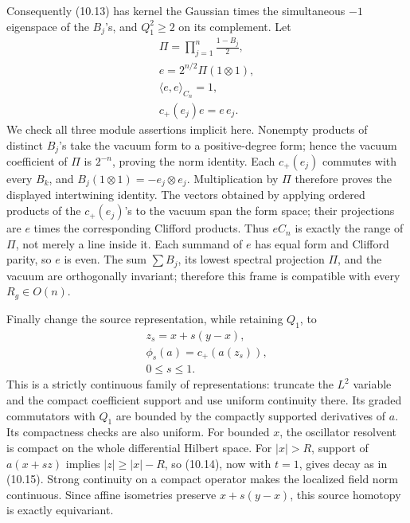 \documentclass[
  11pt,
]{article}
\begin{document}
Consequently (10.13) has kernel the Gaussian times the simultaneous
\(-1\) eigenspace of the \(B_j\)'s, and \(Q_1^2\geq2\) on its
complement. Let \[
\begin{gathered}
\Pi=\prod_{j=1}^n\frac{1-B_j}{2},\\
e=2^{n/2}\Pi(1\otimes1),\\
\langle e,e\rangle_{C_n}=1,\\
c_+(e_j)e=e\,e_j.
\end{gathered}
\tag{10.16}
\] We check all three module assertions implicit here. Nonempty products
of distinct \(B_j\)'s take the vacuum form to a positive-degree form;
hence the vacuum coefficient of \(\Pi\) is \(2^{-n}\), proving the norm
identity. Each \(c_+(e_j)\) commutes with every \(B_k\), and
\(B_j(1\otimes1)=-e_j\otimes e_j\). Multiplication by \(\Pi\) therefore
proves the displayed intertwining identity. The vectors obtained by
applying ordered products of the \(c_+(e_j)\)'s to the vacuum span the
form space; their projections are \(e\) times the corresponding Clifford
products. Thus \(e C_n\) is exactly the range of \(\Pi\), not merely a
line inside it. Each summand of \(e\) has equal form and Clifford
parity, so \(e\) is even. The sum \(\sum B_j\), its lowest spectral
projection \(\Pi\), and the vacuum are orthogonally invariant; therefore
this frame is compatible with every \(R_g\in O(n)\).

Finally change the source representation, while retaining \(Q_1\), to \[
\begin{gathered}
z_s=x+s(y-x),\\
\phi_s(a)=c_+(a(z_s)),\\
0\leq s\leq1.
\end{gathered}
\tag{10.17}
\] This is a strictly continuous family of representations: truncate the
\(L^2\) variable and the compact coefficient support and use uniform
continuity there. Its graded commutators with \(Q_1\) are bounded by the
compactly supported derivatives of \(a\). Its compactness checks are
also uniform. For bounded \(x\), the oscillator resolvent is compact on
the whole differential Hilbert space. For \(|x|>R\), support of
\(a(x+s z)\) implies \(|z|\geq|x|-R\), so (10.14), now with \(t=1\),
gives decay as in (10.15). Strong continuity on a compact operator makes
the localized field norm continuous. Since affine isometries preserve
\(x+s(y-x)\), this source homotopy is exactly equivariant.
\end{document}
